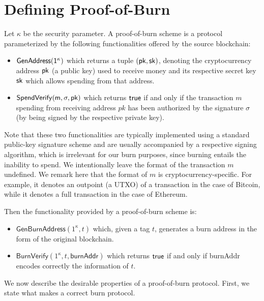 \section{Defining Proof-of-Burn}

Let $\kappa$ be the security parameter. A proof-of-burn scheme is a protocol parameterized by the following functionalities offered by the source blockchain:

\begin{itemize}
  \item $\sf{GenAddress}(1^\kappa)$ which returns a tuple $(\sf{pk}, \sf{sk})$, denoting the cryptocurrency address $\sf{pk}$ (a public key) used to receive money and its respective secret key $\sf{sk}$ which allows spending from that address.

  \item $\sf{SpendVerify}(m, \sigma, pk)$ which returns $\sf{true}$ if and only if the transaction $m$ spending from receiving address $pk$ has been authorized by the signature $\sigma$ (by being signed by the respective private key).
\end{itemize}

Note that these two functionalities are typically implemented using a standard public-key signature scheme and are usually accompanied by a respective signing algorithm, which is irrelevant for our burn purposes, since burning entails the inability to spend. We intentionally leave the format of the transaction $m$ undefined. We remark here that the format of $m$ is cryptocurrency-specific. For example, it denotes an outpoint (a UTXO) of a transaction in the case of Bitcoin, while it denotes a full transaction in the case of Ethereum.

Then the functionality provided by a proof-of-burn scheme is:

\begin{itemize}
  \item $\mathsf{GenBurnAddress}(1^\kappa, t)$ which, given a tag $t$, generates a burn address in the form of the original blockchain.

  \item $\mathsf{BurnVerify}(1^\kappa, t, \mathsf{burnAddr})$ which returns $\sf{true}$ if and only if \textsf{burnAddr} encodes correctly the information of $t$.
\end{itemize}

We now describe the desirable properties of a proof-of-burn protocol. First, we state what makes a correct burn protocol.

